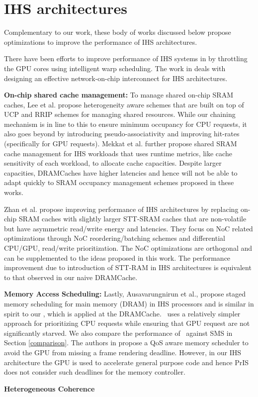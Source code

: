 \section{IHS architectures}
Complementary to our work, these body of works discussed below propose optimizations to improve the performance of IHS architectures. 
\par There have been efforts to improve performance of IHS systems in \cite{gpu-concurrency} by throttling the GPU cores using intelligent warp scheduling. The work in \cite{interconnect} deals with designing an effective network-on-chip interconnect for IHS architectures. 
\par \textbf{On-chip shared cache management:} To manage shared on-chip SRAM caches, Lee et al. \cite{tap}  propose heterogeneity aware schemes that are built on top of UCP and RRIP schemes for managing shared resources. While our chaining mechanism is in line to this to ensure minimum occupancy for CPU requests, it also goes beyond by introducing pseudo-associativity and improving hit-rates (specifically for GPU requests). Mekkat et al. \cite{helm} further propose shared SRAM cache management for IHS workloads that uses runtime metrics, like cache sensitivity of each workload, to allocate cache capacities. Despite larger capacities, DRAMCaches have higher latencies and hence will not be able to adapt quickly to SRAM occupancy management schemes proposed in these works. 
\par Zhan et al. \cite{oscar} propose improving performance of IHS architectures by replacing on-chip SRAM caches with slightly larger STT-SRAM caches that are non-volatile but have asymmetric read/write energy and latencies. They focus on NoC related optimizations through NoC reordering/batching schemes and differential CPU/GPU, read/write prioritization. The NoC optimizations are orthogonal and can be supplemented to the ideas proposed in this work. The performance improvement due to introduction of STT-RAM in IHS architectures is equivalent to that observed in our naive DRAMCache.
\par \textbf{Memory Access Scheduling:} Lastly, Ausavarungnirun et al., \cite{sms} propose staged memory scheduling for main memory (DRAM) in IHS processors and is similar in spirit to our \prioname, which is applied at the DRAMCache. \prioname\ uses a relatively simpler approach for prioritizing CPU requests while ensuring that GPU request are not significantly starved. We also compare the performance of \cachename\ against SMS in Section \ref{comparison}. The authors in \cite{qos-aware} propose a QoS aware memory scheduler to avoid the GPU from missing a frame rendering deadline. However, in our IHS architecture the GPU is used to accelerate general purpose code and hence PrIS does not consider such deadlines for the memory controller.
\par \textbf{Heterogeneous Coherence}

